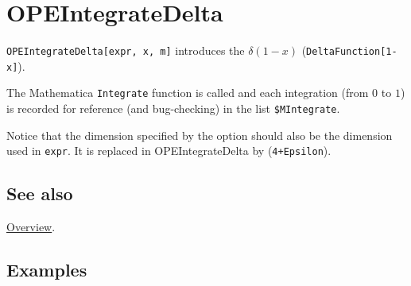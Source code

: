 \documentclass[../FeynCalcManual.tex]{subfiles}
\begin{document}
\hypertarget{opeintegratedelta}{%
\section{OPEIntegrateDelta}\label{opeintegratedelta}}

\texttt{OPEIntegrateDelta[\allowbreak{}expr,\ \allowbreak{}x,\ \allowbreak{}m]}
introduces the \(\delta(1-x)\)
(\texttt{DeltaFunction[\allowbreak{}1-x]}).

The Mathematica \texttt{Integrate} function is called and each
integration (from \(0\) to \(1\)) is recorded for reference (and
bug-checking) in the list \texttt{\$MIntegrate}.

Notice that the dimension specified by the option should also be the
dimension used in \texttt{expr}. It is replaced in OPEIntegrateDelta by
(\texttt{4+Epsilon}).

\subsection{See also}

\hyperlink{toc}{Overview}.

\subsection{Examples}
\end{document}
